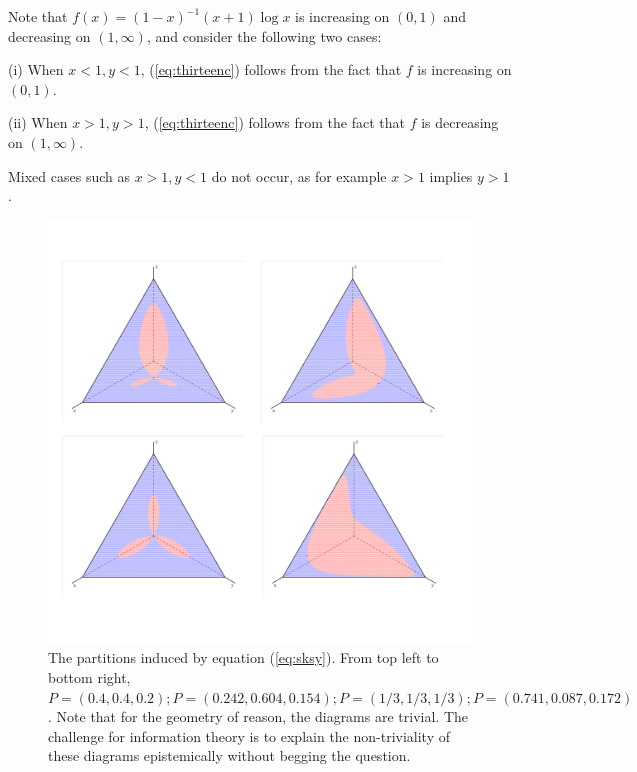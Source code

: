 \documentclass[11pt]{article}
\begin{document}
Note that $f(x)=(1-x)^{-1}(x+1)\log{}x$ is increasing on $(0,1)$ and
decreasing on $(1,\infty{})$, and consider the following two cases:

(i) When $x<1,y<1$, (\ref{eq:thirteenc}) follows from the fact that
$f$ is increasing on $(0,1)$.

(ii) When $x>1,y>1$, (\ref{eq:thirteenc}) follows from the fact that
$f$ is decreasing on $(1,\infty)$.

Mixed cases such as $x>1,y<1$ do not occur, as for example $x>1$
implies $y>1$.

\begin{figure}[ht]
  \begin{flushright}
    \begin{minipage}[h]{\linewidth}
      \includegraphics[width=\textwidth]{concat2.png}
      \caption{\footnotesize The partitions induced by equation
        (\ref{eq:sksy}). From top left to bottom right,
        $P=(0.4,0.4,0.2); P=(0.242,0.604,0.154); P=(1/3,1/3,1/3); 
        P=(0.741,0.087,0.172)$.
        Note that for the geometry of reason, the diagrams are
        trivial. The challenge for information theory is to explain
        the non-triviality of these diagrams epistemically without
        begging the question.}
      \label{fig:concat}
    \end{minipage}
  \end{flushright}
\end{figure}



 

\end{document}
